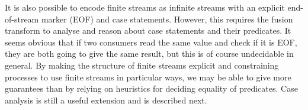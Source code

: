 It is also possible to encode finite streams as infinite streams with an explicit end-of-stream marker (EOF) and case statements. However, this requires the fusion transform to analyse and reason about case statements and their predicates. It seems obvious that if two consumers read the same value and check if it is EOF, they are both going to give the same result, but this is of course undecidable in general. By making the structure of finite streams explicit and constraining processes to use finite streams in particular ways, we may be able to give more guarantees than by relying on heuristics for deciding equality of predicates. Case analysis is still a useful extension and is described next.

% 
% 
% 
